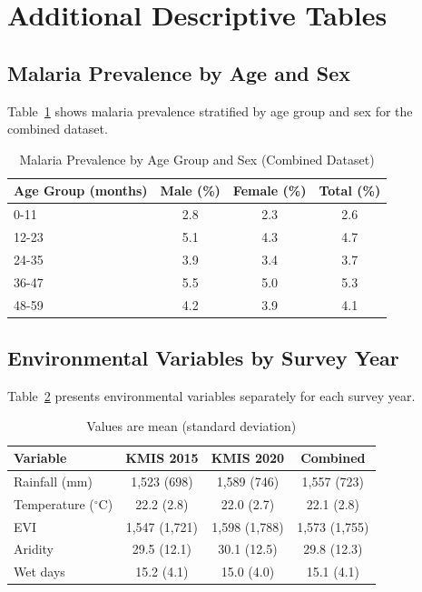 \section{Additional Descriptive Tables}

\subsection{Malaria Prevalence by Age and Sex}

Table~\ref{tab:appendix_age_sex} shows malaria prevalence stratified by age group and sex for the combined dataset.

\begin{table}[htbp]
	\centering
	\caption{Malaria Prevalence by Age Group and Sex (Combined Dataset)}
	\label{tab:appendix_age_sex}
	\begin{tabular}{@{}lccc@{}}
		\toprule
		\textbf{Age Group (months)} & \textbf{Male (\%)} & \textbf{Female (\%)} & \textbf{Total (\%)} \\
		\midrule
		0-11 & 2.8 & 2.3 & 2.6 \\
		12-23 & 5.1 & 4.3 & 4.7 \\
		24-35 & 3.9 & 3.4 & 3.7 \\
		36-47 & 5.5 & 5.0 & 5.3 \\
		48-59 & 4.2 & 3.9 & 4.1 \\
		\bottomrule
	\end{tabular}
\end{table}

\subsection{Environmental Variables by Survey Year}

Table~\ref{tab:appendix_env_by_year} presents environmental variables separately for each survey year.

\begin{table}[htbp]
	\centering
	\caption{Environmental Variables by Survey Year}
	\label{tab:appendix_env_by_year}
	\begin{tabular}{@{}lccc@{}}
		\toprule
		\textbf{Variable} & \textbf{KMIS 2015} & \textbf{KMIS 2020} & \textbf{Combined} \\
		\midrule
		Rainfall (mm) & 1,523 (698) & 1,589 (746) & 1,557 (723) \\
		Temperature ($^\circ$C) & 22.2 (2.8) & 22.0 (2.7) & 22.1 (2.8) \\
		EVI & 1,547 (1,721) & 1,598 (1,788) & 1,573 (1,755) \\
		Aridity & 29.5 (12.1) & 30.1 (12.5) & 29.8 (12.3) \\
		Wet days & 15.2 (4.1) & 15.0 (4.0) & 15.1 (4.1) \\
		\bottomrule
	\end{tabular}
	\caption*{Values are mean (standard deviation)}
\end{table}

